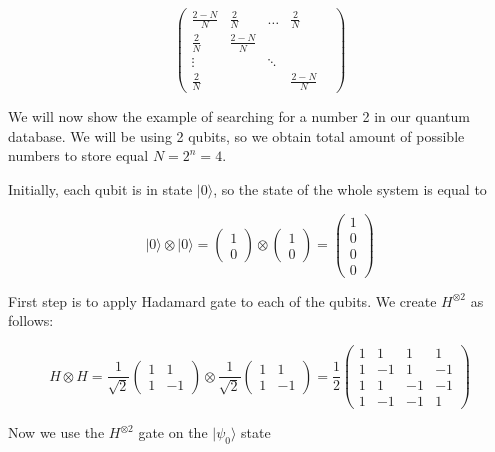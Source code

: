 \[\begin{pmatrix} \frac{2 - N}{N} & \frac{2}{N} & \hdots & \frac{2}{N} \\ \frac{2}{N} & \frac{2 - N}{N} & & & \\ \vdots & & \ddots & \\ \frac{2}{N} & & & \frac{2 - N}{N} \end{pmatrix}\]

\begin{example}
We will now show the example of searching for a number 2 in our quantum database. We will be using 2 qubits, so we obtain total amount of possible numbers to store equal $N = 2^n = 4$.

Initially, each qubit is in state $|0\rangle$, so the state of the whole system is equal to

\[ |0\rangle \otimes |0\rangle = \begin{pmatrix} 1 \\ 0 \end{pmatrix} \otimes \begin{pmatrix} 1 \\ 0 \end{pmatrix} = \begin{pmatrix} 1 \\ 0 \\ 0 \\ 0 \end{pmatrix}\]

First step is to apply Hadamard gate to each of the qubits. We create $H^{\otimes 2}$ as follows:

\[ H \otimes H = \frac{1}{\sqrt{2}} \begin{pmatrix} 1 & 1 \\ 1 & -1 \end{pmatrix} \otimes \frac{1}{\sqrt{2}} \begin{pmatrix} 1 & 1 \\ 1 & -1 \end{pmatrix} = \frac{1}{2} \begin{pmatrix} 1 & 1 & 1 & 1 \\ 1 & -1 & 1 & -1 \\ 1 & 1 & -1 & -1 \\ 1 & -1 & -1 & 1\end{pmatrix}\]

Now we use the $H^{\otimes 2}$ gate on the $|\psi_0\rangle$ state


\end{example}
